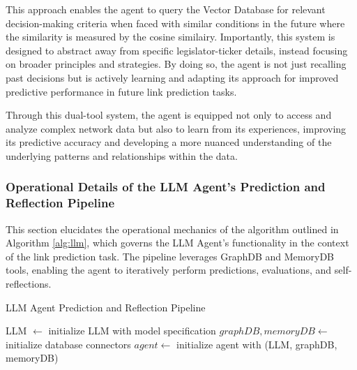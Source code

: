 \documentclass[15pt,letterpaper]{article}
\begin{document}
This approach enables the agent to query the Vector Database for relevant decision-making criteria when faced with similar conditions in the future where the similarity is measured by the cosine similairy. Importantly, this system is designed to abstract away from specific legislator-ticker details, instead focusing on broader principles and strategies. By doing so, the agent is not just recalling past decisions but is actively learning and adapting its approach for improved predictive performance in future link prediction tasks.

Through this dual-tool system, the agent is equipped not only to access and analyze complex network data but also to learn from its experiences, improving its predictive accuracy and developing a more nuanced understanding of the underlying patterns and relationships within the data.

\subsubsection{Operational Details of the LLM Agent's Prediction and Reflection Pipeline}

This section elucidates the operational mechanics of the algorithm outlined in Algorithm \ref{alg:llm}, which governs the LLM Agent's functionality in the context of the link prediction task. The pipeline leverages GraphDB and MemoryDB tools, enabling the agent to iteratively perform predictions, evaluations, and self-reflections.

\vspace{5mm} %

\begin{algorithm}[H]
  \caption{LLM Agent Prediction and Reflection Pipeline}
  \label{alg:llm}
  \SetAlgoLined
  LLM $\leftarrow$ initialize LLM with model specification\;
  $graphDB, memoryDB \leftarrow$ initialize database connectors\;
  $agent \leftarrow$ initialize agent with (LLM, graphDB, memoryDB)\;
  
  \end{algorithm}

\vspace{5mm} %
\end{document}
